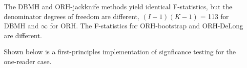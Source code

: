 \documentclass[
]{book}
\newenvironment{Shaded}{\begin{snugshade}}{\end{snugshade}}
\newcommand{\CommentTok}[1]{\textcolor[rgb]{0.56,0.35,0.01}{\textit{#1}}}
\newcommand{\DataTypeTok}[1]{\textcolor[rgb]{0.13,0.29,0.53}{#1}}
\newcommand{\KeywordTok}[1]{\textcolor[rgb]{0.13,0.29,0.53}{\textbf{#1}}}
\newcommand{\NormalTok}[1]{#1}
\newcommand{\OperatorTok}[1]{\textcolor[rgb]{0.81,0.36,0.00}{\textbf{#1}}}
\newcommand{\StringTok}[1]{\textcolor[rgb]{0.31,0.60,0.02}{#1}}
\begin{document}
\begin{Shaded}
\end{Shaded}

The DBMH and ORH-jackknife methods yield identical F-statistics, but the denominator degrees of freedom are different, \((I-1)(K-1)\) = 113 for DBMH and \(\infty\) for ORH. The F-statistics for ORH-bootstrap and ORH-DeLong are different.

Shown below is a first-principles implementation of signficance testing for the one-reader case.
\end{document}
